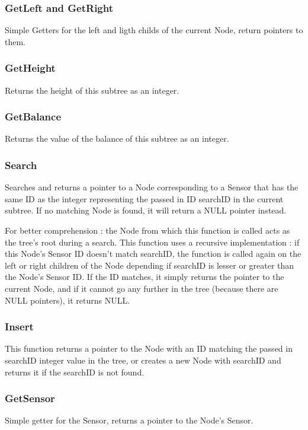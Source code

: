 \documentclass[10pt]{article}
\begin{document}
\subsubsection*{GetLeft and GetRight}
Simple Getters for the left and ligth childs of the current Node, return pointers to them.

\subsubsection*{GetHeight}
Returns the height of this subtree as an integer.

\subsubsection*{GetBalance}
Returns the value of the balance of this subtree as an integer.

\subsubsection*{Search}
Searches and returns a pointer to a Node corresponding to a Sensor that has the same ID as the integer representing the passed in ID searchID in the current subtree. If no matching Node is found, it will return a NULL pointer instead.


For better comprehension : the Node from which this function is called acts as the tree's root during a search. This function uses a recursive implementation : if this Node's Sensor ID doesn't match searchID, the function is called again on the left or right children of the Node depending if searchID is lesser or greater than the Node's Sensor ID. If the ID matches, it simply returns the pointer to the current Node, and if it cannot go any further in the tree (because there are NULL pointers), it returns NULL. 

\subsubsection*{Insert}
This function returns a pointer to the Node with an ID matching the passed in searchID integer value in the tree, or creates a new Node with searchID and returns it if the searchID is not found.

\subsubsection*{GetSensor}
Simple getter for the Sensor, returns a pointer to the Node's Sensor.
\end{document}

